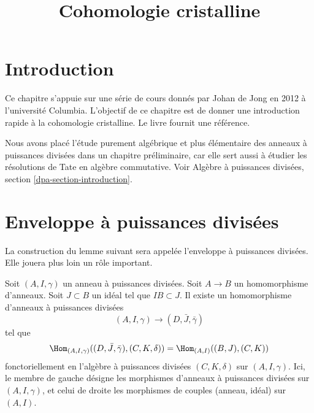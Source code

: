 

%


\title{Cohomologie cristalline}


\maketitle

\label{section-phantom}

\tableofcontents



\section{Introduction}
\label{section-introduction}

\noindent
Ce chapitre s'appuie sur une série de cours donnés par Johan de Jong
en 2012 à l'université Columbia.
L'objectif de ce chapitre est de donner une introduction rapide à la
cohomologie cristalline. Le livre \cite{Berthelot} fournit une référence.

\medskip\noindent
Nous avons placé l'étude purement algébrique et plus élémentaire des anneaux
à puissances divisées dans un chapitre préliminaire, car elle sert aussi
à étudier les résolutions de Tate en algèbre commutative.
Voir Algèbre à puissances divisées, section \ref{dpa-section-introduction}.













\section{Enveloppe à puissances divisées}
\label{section-divided-power-envelope}

\noindent
La construction du lemme suivant sera appelée l'enveloppe à
puissances divisées. Elle jouera plus loin un rôle important.

\begin{lemma}
\label{lemma-divided-power-envelope}
Soit $(A, I, \gamma)$ un anneau à puissances divisées.
Soit $A \to B$ un homomorphisme d'anneaux. Soit $J \subset B$ un idéal
tel que $IB \subset J$. Il existe un homomorphisme d'anneaux
à puissances divisées
$$
(A, I, \gamma) \longrightarrow (D, \bar J, \bar \gamma)
$$
tel que
$$
\Hom_{(A, I, \gamma)}((D, \bar J, \bar \gamma), (C, K, \delta)) =
\Hom_{(A, I)}((B, J), (C, K))
$$
fonctoriellement en l'algèbre à puissances divisées $(C, K, \delta)$ sur
$(A, I, \gamma)$. Ici, le membre de gauche désigne les morphismes d'anneaux
à puissances divisées sur $(A, I, \gamma)$, et celui de droite les morphismes
de couples (anneau, idéal) sur $(A, I)$.
\end{lemma}

